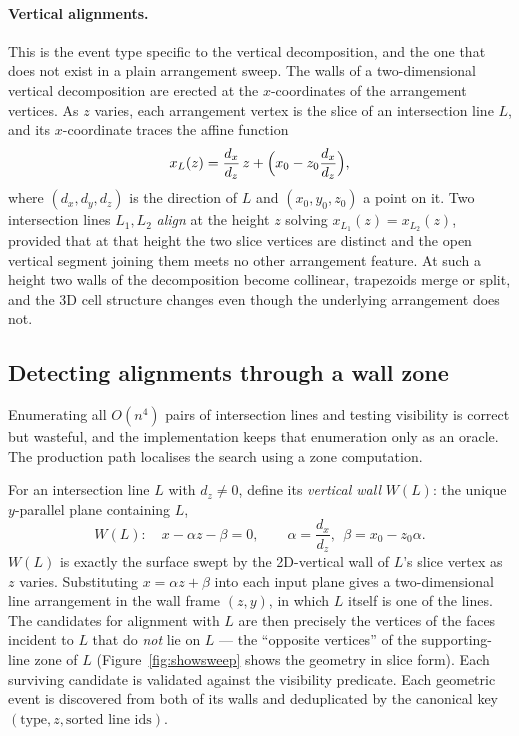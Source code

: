\documentclass[11pt]{article}
\begin{document}
\paragraph{Vertical alignments.}
This is the event type specific to the vertical decomposition, and the one that
does not exist in a plain arrangement sweep.  The walls of a two-dimensional
vertical decomposition are erected at the $x$-coordinates of the arrangement
vertices.  As $z$ varies, each arrangement vertex is the slice of an
intersection line $L$, and its $x$-coordinate traces the affine function
\begin{equation}
  x_L(z) = \frac{d_x}{d_z}\, z + \Bigl(x_0 - z_0 \frac{d_x}{d_z}\Bigr),
  \label{eq:xofz}
\end{equation}
where $(d_x,d_y,d_z)$ is the direction of $L$ and $(x_0,y_0,z_0)$ a point on
it.  Two intersection lines $L_1, L_2$ \emph{align} at the height $z$ solving
$x_{L_1}(z) = x_{L_2}(z)$, provided that at that height the two slice vertices
are distinct and the open vertical segment joining them meets no other
arrangement feature.  At such a height two walls of the decomposition become
collinear, trapezoids merge or split, and the 3D cell structure changes even
though the underlying arrangement does not.

\subsection{Detecting alignments through a wall zone}

Enumerating all $O(n^4)$ pairs of intersection lines and testing visibility is
correct but wasteful, and the implementation keeps that enumeration only as an
oracle.  The production path localises the search using a zone computation.

For an intersection line $L$ with $d_z \neq 0$, define its \emph{vertical
wall} $W(L)$: the unique $y$-parallel plane containing $L$,
\[
  W(L):\quad x - \alpha z - \beta = 0, \qquad
  \alpha = \frac{d_x}{d_z},\ \ \beta = x_0 - z_0\alpha .
\]
$W(L)$ is exactly the surface swept by the 2D-vertical wall of $L$'s slice
vertex as $z$ varies.  Substituting $x = \alpha z + \beta$ into each input plane
gives a two-dimensional line arrangement in the wall frame $(z, y)$, in which
$L$ itself is one of the lines.  The candidates for alignment with $L$ are then
precisely the vertices of the faces incident to $L$ that do \emph{not} lie on
$L$ --- the ``opposite vertices'' of the supporting-line zone of $L$
(Figure~\ref{fig:showsweep} shows the geometry in slice form).  Each surviving
candidate is validated against the visibility predicate.  Each geometric event
is discovered from both of its walls and deduplicated by the canonical key
$(\text{type}, z, \text{sorted line ids})$.
\end{document}
